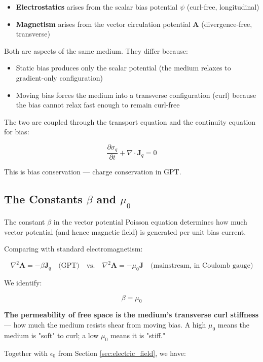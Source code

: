 \documentclass[12pt, a4paper]{article}
\begin{document}
\begin{itemize}
    \item \textbf{Electrostatics} arises from the scalar bias potential \( \psi \) (curl-free, longitudinal)
    \item \textbf{Magnetism} arises from the vector circulation potential \( \mathbf{A} \) (divergence-free, transverse)
\end{itemize}

Both are aspects of the same medium. They differ because:
\begin{itemize}
    \item Static bias produces only the scalar potential (the medium relaxes to gradient-only configuration)
    \item Moving bias forces the medium into a transverse configuration (curl) because the bias cannot relax fast enough to remain curl-free
\end{itemize}

The two are coupled through the transport equation and the continuity equation for bias:

\[
\frac{\partial \sigma_q}{\partial t} + \nabla \cdot \mathbf{J}_q = 0
\]

This is bias conservation — charge conservation in GPT.

\subsection{The Constants \( \beta \) and \( \mu_0 \)}
\label{subsec:beta_mu0}

The constant \( \beta \) in the vector potential Poisson equation determines how much vector potential (and hence magnetic field) is generated per unit bias current.

Comparing with standard electromagnetism:

\[
\nabla^2 \mathbf{A} = -\beta \mathbf{J}_q \quad \text{(GPT)} \quad \text{vs.} \quad \nabla^2 \mathbf{A} = -\mu_0 \mathbf{J} \quad \text{(mainstream, in Coulomb gauge)}
\]

We identify:

\[
\beta = \mu_0
\]

\textbf{The permeability of free space is the medium's transverse curl stiffness} — how much the medium resists shear from moving bias. A high \( \mu_0 \) means the medium is "soft" to curl; a low \( \mu_0 \) means it is "stiff."

Together with \( \epsilon_0 \) from Section \ref{sec:electric_field}, we have:
\end{document}
